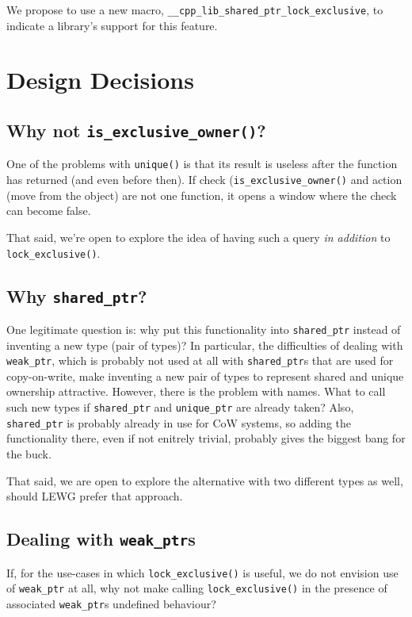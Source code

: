 \documentclass[11pt]{article}
\newcommand{\lockx}{\texttt{lock\_exclusive()}}
\newcommand{\uptr}{\texttt{unique\_ptr}}
\newcommand{\wptr}{\texttt{weak\_ptr}}
\newcommand{\sptr}{\texttt{shared\_ptr}}
\begin{document}
We propose to use a new macro,
\texttt{\_\_cpp\_lib\_shared\_ptr\_lock\_exclusive}, to indicate a
library's support for this feature.

\section{Design Decisions}

\subsection{Why not \texttt{is\_exclusive\_owner()}?}

One of the problems with \texttt{unique()} is that its result is
useless after the function has returned (and even before then). If
check (\texttt{is\_exclusive\_owner()} and action (move from the
object) are not one function, it opens a window where the check can
become false.

That said, we're open to explore the idea of having such a query
\emph{in addition} to \lockx.

\subsection{Why \sptr?}

One legitimate question is: why put this functionality into \sptr{}
instead of inventing a new type (pair of types)? In particular, the
difficulties of dealing with \wptr, which is probably not used at all
with \sptr{}s that are used for copy-on-write, make inventing a new
pair of types to represent shared and unique ownership
attractive. However, there is the problem with names. What to call
such new types if \sptr{} and \uptr{} are already taken? Also, \sptr{}
is probably already in use for CoW systems, so adding the
functionality there, even if not enitrely trivial, probably gives the
biggest bang for the buck.

That said, we are open to explore the alternative with two different
types as well, should LEWG prefer that approach.

\subsection{Dealing with \wptr{}s}

If, for the use-cases in which \lockx{} is useful, we do not envision
use of \wptr{} at all, why not make calling \lockx{} in the presence
of associated \wptr{}s undefined behaviour?
\end{document}
